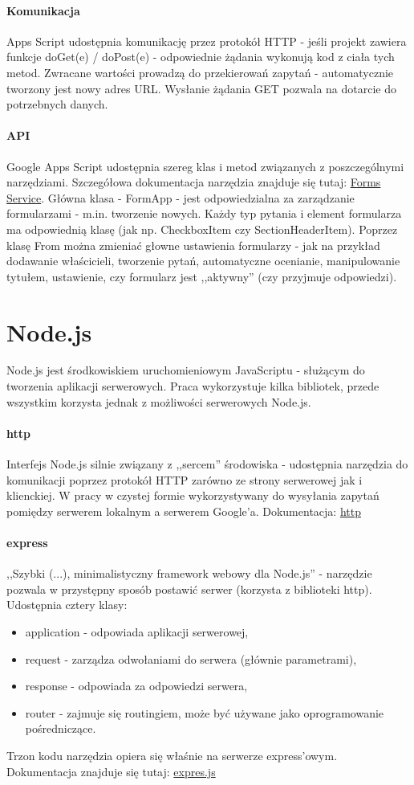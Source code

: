 \paragraph{Komunikacja}
 Apps Script udostępnia komunikację przez protokół HTTP - jeśli projekt zawiera funkcje doGet(e) / doPost(e) - odpowiednie żądania wykonują kod z ciała tych metod. Zwracane wartości prowadzą do przekierowań zapytań  - automatycznie tworzony jest nowy adres URL. Wysłanie żądania GET pozwala na dotarcie do potrzebnych danych. 
\paragraph{API}
Google Apps Script udostępnia szereg klas i metod związanych z poszczególnymi narzędziami. Szczegółowa dokumentacja narzędzia znajduje się tutaj: \href{https://developers.google.com/apps-script/reference/forms}{Forms Service}.
 Główna klasa - FormApp - jest odpowiedzialna za zarządzanie formularzami - m.in. tworzenie nowych. Każdy typ pytania i element formularza ma odpowiednią klasę (jak np. CheckboxItem czy SectionHeaderItem). Poprzez klasę From  można zmieniać głowne ustawienia formularzy  - jak na przykład dodawanie właścicieli, tworzenie pytań, automatyczne ocenianie, manipulowanie tytułem, ustawienie, czy formularz jest ,,aktywny'' (czy przyjmuje odpowiedzi).
 
 
\section{Node.js}
Node.js jest środkowiskiem uruchomieniowym JavaScriptu - służącym do tworzenia aplikacji serwerowych. 
Praca wykorzystuje kilka bibliotek, przede wszystkim korzysta jednak z możliwości serwerowych Node.js. 
\paragraph{http}
Interfejs Node.js silnie związany z ,,sercem'' środowiska - udostępnia narzędzia do komunikacji poprzez protokół  HTTP zarówno ze strony serwerowej jak i klienckiej. W pracy w czystej formie wykorzystywany do wysyłania zapytań pomiędzy serwerem lokalnym a serwerem Google'a.
\newline Dokumentacja: \href{https://nodejs.org/api/http.html}{http}
\paragraph{express}
,,Szybki (...), minimalistyczny framework webowy dla Node.js'' - narzędzie pozwala w przystępny sposób postawić serwer (korzysta z biblioteki http). Udostępnia cztery klasy:
\begin{itemize}
\item application - odpowiada aplikacji serwerowej,
\item  request - zarządza odwołaniami do serwera (głównie parametrami),
\item response - odpowiada za odpowiedzi serwera,
\item router - zajmuje się routingiem, może być używane jako oprogramowanie pośredniczące.
\end{itemize}
Trzon kodu narzędzia opiera się właśnie na serwerze express'owym.
\ind Dokumentacja znajduje się tutaj: \href{https://expressjs.com/}{expres.js}
